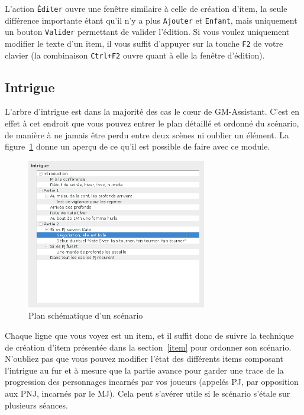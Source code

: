\documentclass[a4paper,12pt]{article}
\newcommand*{\GMA}{GM-Assistant\xspace}
\newcommand*{\interfaceitem}[1]{\texttt{#1}}
\begin{document}
L'action \interfaceitem{Éditer} ouvre une fenêtre similaire à celle de création d'item, la seule différence importante étant qu'il n'y a plus \interfaceitem{Ajouter} et \interfaceitem{Enfant}, mais uniquement un bouton \interfaceitem{Valider} permettant de valider l'édition.
Si vous voulez uniquement modifier le texte d'un item, il vous suffit d'appuyer sur la touche \interfaceitem{F2} de votre clavier (la combinaison \interfaceitem{Ctrl+F2} ouvre quant à elle la fenêtre d'édition).

\subsection{Intrigue}
\label{sec:intrigue}

L'arbre d'intrigue est dans la majorité des cas le cœur de \GMA.
C'est en effet à cet endroit que vous pouvez entrer le plan détaillé et ordonné du scénario, de manière à ne jamais être perdu entre deux scènes ni oublier un élément.
La figure~\ref{arbre_scenar} donne un aperçu de ce qu'il est possible de faire avec ce module.
\begin{figure}[ht]
    \centerline{\includegraphics[width=0.7\textwidth]{scenario_type}}
    \caption{Plan schématique d'un scénario}
    \label{arbre_scenar}
\end{figure}
Chaque ligne que vous voyez est un item, et il suffit donc de suivre la technique de création d'item présentée dans la section~\ref{item} pour ordonner son scénario.
N'oubliez pas que vous pouvez modifier l'état des différents items composant l'intrigue au fur et à mesure que la partie avance pour garder une trace de la progression des personnages incarnés par vos joueurs (appelés PJ, par opposition aux PNJ, incarnés par le MJ).
Cela peut s'avérer utile si le scénario s'étale sur plusieurs séances.
\end{document}
